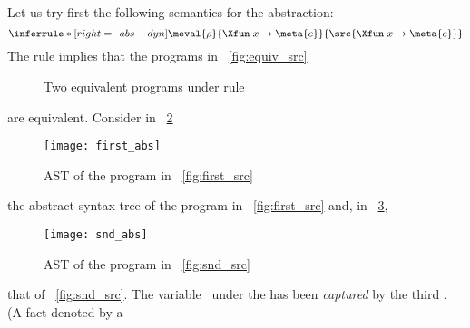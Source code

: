 Let us try first the following semantics for the abstraction:
\begin{equation*}
\inferrule*[right=\;\, abs-dyn]
  {}
  {\meval{\rho}
         {\Xfun \; x \rightarrow \meta{e}}
         {\src{\Xfun \; x \rightarrow \meta{e}}}}
\end{equation*}
The rule  implies that the programs in
\fig~\vref{fig:equiv_src}
\begin{figure}
\centering
{}
\qquad
{}
\caption{Two equivalent programs under rule  \label{fig:equiv_src}}
\end{figure}
are equivalent. Consider in \fig~\ref{fig:first_abs}
\begin{figure}[!t]
\centering
\texttt{[image: first\_abs]}
\caption{AST of the program in \fig~\vref{fig:first_src}\label{fig:first_abs}}
\end{figure}
the abstract syntax tree of the program in \fig~\ref{fig:first_src}
and, in \fig~\ref{fig:snd_abs},
\begin{figure}[!b]
\centering
\texttt{[image: snd\_abs]}
\caption{AST of the program in \fig~\vref{fig:snd_src}\label{fig:snd_abs}}
\end{figure}
that of \fig~\ref{fig:snd_src}. The variable~ under the \Xfun
has been \emph{captured} by the third \Xlet. (A fact denoted by a
